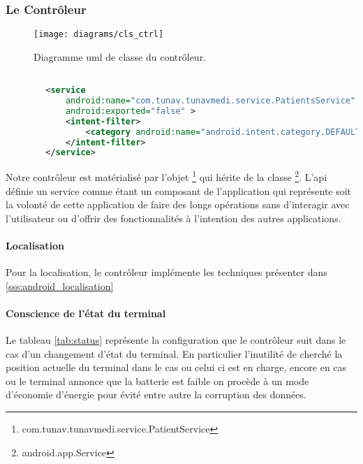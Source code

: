 \subsubsection{Le Contrôleur}

\begin{figure}
\center
\texttt{[image: diagrams/cls\_ctrl]}
\caption{Diagramme \gls{uml} de classe du contrôleur.}
\label{fig:cls_ctrl}
\end{figure}

\begin{lstlisting}[language=xml, caption=Déclaration dans AndroidManifest du PatientService]

        <service
            android:name="com.tunav.tunavmedi.service.PatientsService"
            android:exported="false" >
            <intent-filter>
                <category android:name="android.intent.category.DEFAULT" />
            </intent-filter>
        </service>

\end{lstlisting}

Notre contrôleur est matérialisé par l'objet
\footnote{com.tunav.tunavmedi.service.PatientService} qui
hérite de la classe \footnote{android.app.Service}. L'\gls{api}
\android{} définie un service comme étant un composant de l'application qui
représente soit la volonté de cette application de faire des longs opérations
sans d’interagir avec l'utilisateur ou d’offrir des fonctionnalités à
l'intention des autres applications\cite{api:service}.

\paragraph{Localisation}
Pour la localisation, le contrôleur implémente les techniques présenter dans \ref{sss:android_localisation}

\paragraph{Conscience de l'état du terminal}

Le tableau \ref{tab:status} représente la configuration que le contrôleur suit dans le cas d'un changement d’état du terminal. En particulier l'inutilité de cherché la position actuelle du terminal dans le cas ou celui ci est en charge, encore en cas ou le terminal annonce que la batterie est faible on procède à un mode d’économie d’énergie pour évité entre autre la corruption des données.

